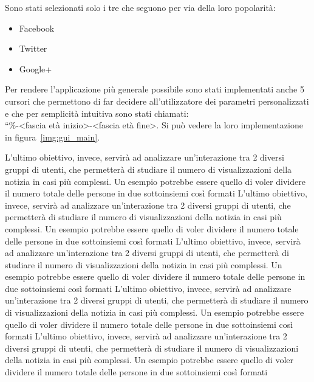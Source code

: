 Sono stati selezionati solo i tre che seguono per via della loro popolarità:
\begin{itemize}
 \item Facebook
 \item Twitter
 \item Google+
\end{itemize}

Per rendere l'applicazione più generale possibile sono stati implementati anche 5 cursori che permettono di far 
decidere all'utilizzatore dei parametri personalizzati e che per semplicità intuitiva sono 
stati chiamati:\\ ``\%-<fascia età inizio>-<fascia età fine>.
Si può vedere la loro implementazione in figura~\ref{img:gui_main}.



L'ultimo obiettivo, invece, servirà ad analizzare un'interazione tra 2 diversi gruppi di utenti, che 
permetterà di studiare il numero di visualizzazioni della notizia in casi più complessi.
Un esempio potrebbe essere quello di voler dividere il numero totale delle persone in due sottoinsiemi così formati
L'ultimo obiettivo, invece, servirà ad analizzare un'interazione tra 2 diversi gruppi di utenti, che 
permetterà di studiare il numero di visualizzazioni della notizia in casi più complessi.
Un esempio potrebbe essere quello di voler dividere il numero totale delle persone in due sottoinsiemi così formati
L'ultimo obiettivo, invece, servirà ad analizzare un'interazione tra 2 diversi gruppi di utenti, che 
permetterà di studiare il numero di visualizzazioni della notizia in casi più complessi.
Un esempio potrebbe essere quello di voler dividere il numero totale delle persone in due sottoinsiemi così formati
L'ultimo obiettivo, invece, servirà ad analizzare un'interazione tra 2 diversi gruppi di utenti, che 
permetterà di studiare il numero di visualizzazioni della notizia in casi più complessi.
Un esempio potrebbe essere quello di voler dividere il numero totale delle persone in due sottoinsiemi così formati
L'ultimo obiettivo, invece, servirà ad analizzare un'interazione tra 2 diversi gruppi di utenti, che 
permetterà di studiare il numero di visualizzazioni della notizia in casi più complessi.
Un esempio potrebbe essere quello di voler dividere il numero totale delle persone in due sottoinsiemi così formati










